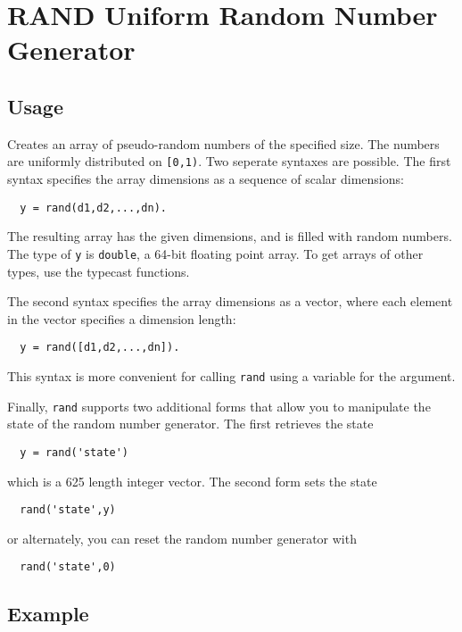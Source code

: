 \section{RAND Uniform Random Number Generator}

\subsection{Usage}

Creates an array of pseudo-random numbers of the specified size.
The numbers are uniformly distributed on \verb|[0,1)|.  
Two seperate syntaxes are possible.  The first syntax specifies the array 
dimensions as a sequence of scalar dimensions:
\begin{verbatim}
  y = rand(d1,d2,...,dn).
\end{verbatim}
The resulting array has the given dimensions, and is filled with
random numbers.  The type of \verb|y| is \verb|double|, a 64-bit floating
point array.  To get arrays of other types, use the typecast 
functions.
    
The second syntax specifies the array dimensions as a vector,
where each element in the vector specifies a dimension length:
\begin{verbatim}
  y = rand([d1,d2,...,dn]).
\end{verbatim}
This syntax is more convenient for calling \verb|rand| using a 
variable for the argument.

Finally, \verb|rand| supports two additional forms that allow
you to manipulate the state of the random number generator.
The first retrieves the state
\begin{verbatim}
  y = rand('state')
\end{verbatim}
which is a 625 length integer vector.  The second form sets
the state
\begin{verbatim}
  rand('state',y)
\end{verbatim}
or alternately, you can reset the random number generator with
\begin{verbatim}
  rand('state',0)
\end{verbatim}
\subsection{Example}

